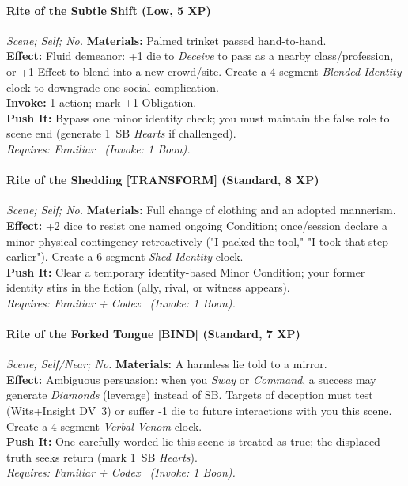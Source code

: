 \paragraph*{Rite of the Subtle Shift (Low, 5 XP)} \emph{Scene; Self; No.}
\textbf{Materials:} Palmed trinket passed hand-to-hand.\\
\textbf{Effect:} Fluid demeanor: +1 die to \emph{Deceive} to pass as a nearby class/profession, or +1 Effect to blend into a new crowd/site. Create a 4-segment \emph{Blended Identity} clock to downgrade one social complication.\\
\textbf{Invoke:} 1 action; mark +1 Obligation.\\
\textbf{Push It:} Bypass one minor identity check; you must maintain the false role to scene end (generate 1~SB \emph{Hearts} if challenged).\\
\emph{Requires: Familiar \ (\textit{Invoke:} 1 Boon).}

\paragraph{Rite of the Shedding \textnormal{[TRANSFORM]} (Standard, 8 XP)} \emph{Scene; Self; No.}
\textbf{Materials:} Full change of clothing and an adopted mannerism.\\
\textbf{Effect:} +2 dice to resist one named ongoing Condition; once/session declare a minor physical contingency retroactively ("I packed the tool," "I took that step earlier"). Create a 6-segment \emph{Shed Identity} clock.\\
\textbf{Push It:} Clear a temporary identity-based Minor Condition; your former identity stirs in the fiction (ally, rival, or witness appears).\\
\emph{Requires: Familiar + Codex \ (\textit{Invoke:} 1 Boon).}

\paragraph{Rite of the Forked Tongue \textnormal{[BIND]} (Standard, 7 XP)} \emph{Scene; Self/Near; No.}
\textbf{Materials:} A harmless lie told to a mirror.\\
\textbf{Effect:} Ambiguous persuasion: when you \emph{Sway} or \emph{Command}, a success may generate \emph{Diamonds} (leverage) instead of SB. Targets of deception must test (Wits+Insight DV~3) or suffer -1 die to future interactions with you this scene. Create a 4-segment \emph{Verbal Venom} clock.\\
\textbf{Push It:} One carefully worded lie this scene is treated as true; the displaced truth seeks return (mark 1~SB \emph{Hearts}).\\
\emph{Requires: Familiar + Codex \ (\textit{Invoke:} 1 Boon).}

